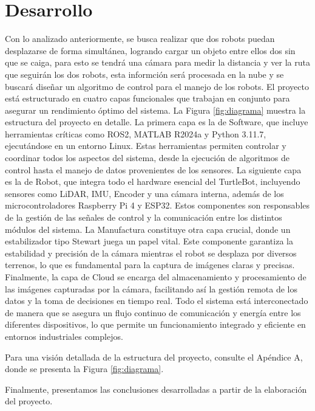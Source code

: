 \documentclass[conference]{IEEEtran}
\begin{document}
 

\section{Desarrollo}
    Con lo analizado anteriormente, se busca realizar que dos robots puedan desplazarse de forma simultánea, logrando cargar un objeto entre ellos dos sin que se caiga, para esto se tendrá una cámara para medir la distancia y ver la ruta que seguirán los dos robots, esta informción será procesada en la nube y se buscará diseñar un algoritmo de control para el manejo de los robots.
    El proyecto está estructurado en cuatro capas funcionales que trabajan en conjunto para asegurar un rendimiento óptimo del sistema. La Figura \ref{fig:diagrama} muestra la estructura del proyecto en detalle. La primera capa es la de Software, que incluye herramientas críticas como ROS2, MATLAB R2024a y Python 3.11.7, ejecutándose en un entorno Linux. Estas herramientas permiten controlar y coordinar todos los aspectos del sistema, desde la ejecución de algoritmos de control hasta el manejo de datos provenientes de los sensores.
    La siguiente capa es la de Robot, que integra todo el hardware esencial del TurtleBot, incluyendo sensores como LiDAR, IMU, Encoder y una cámara interna, además de los microcontroladores Raspberry Pi 4 y ESP32. Estos componentes son responsables de la gestión de las señales de control y la comunicación entre los distintos módulos del sistema.
    La Manufactura constituye otra capa crucial, donde un estabilizador tipo Stewart juega un papel vital. Este componente garantiza la estabilidad y precisión de la cámara mientras el robot se desplaza por diversos terrenos, lo que es fundamental para la captura de imágenes claras y precisas.
    Finalmente, la capa de Cloud se encarga del almacenamiento y procesamiento de las imágenes capturadas por la cámara, facilitando así la gestión remota de los datos y la toma de decisiones en tiempo real. Todo el sistema está interconectado de manera que se asegura un flujo continuo de comunicación y energía entre los diferentes dispositivos, lo que permite un funcionamiento integrado y eficiente en entornos industriales complejos.

    Para una visión detallada de la estructura del proyecto, consulte el Apéndice A, donde se presenta la Figura \ref{fig:diagrama}.

    Finalmente, presentamos las conclusiones desarrolladas a partir de la elaboración del proyecto.
\end{document}
